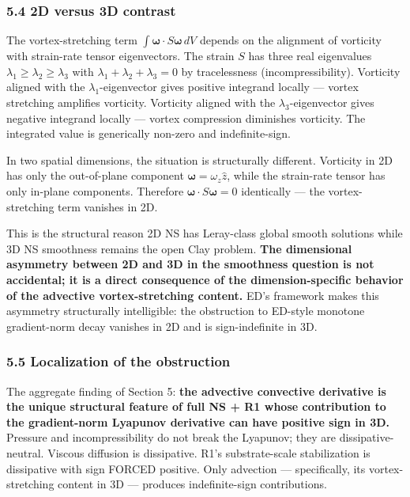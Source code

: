 \documentclass[
  11pt,a4paper]{article}
\begin{document}
\subsubsection{5.4 2D versus 3D contrast}\label{d-versus-3d-contrast}

The vortex-stretching term
\(\int \boldsymbol{\omega} \cdot S\boldsymbol{\omega} \, dV\) depends on
the alignment of vorticity with strain-rate tensor eigenvectors. The
strain \(S\) has three real eigenvalues
\(\lambda_1 \ge \lambda_2 \ge \lambda_3\) with
\(\lambda_1 + \lambda_2 + \lambda_3 = 0\) by tracelessness
(incompressibility). Vorticity aligned with the
\(\lambda_1\)-eigenvector gives positive integrand locally --- vortex
stretching amplifies vorticity. Vorticity aligned with the
\(\lambda_3\)-eigenvector gives negative integrand locally --- vortex
compression diminishes vorticity. The integrated value is generically
non-zero and indefinite-sign.

In two spatial dimensions, the situation is structurally different.
Vorticity in 2D has only the out-of-plane component
\(\boldsymbol{\omega} = \omega_z \hat{z}\), while the strain-rate tensor
has only in-plane components. Therefore
\(\boldsymbol{\omega} \cdot S\boldsymbol{\omega} = 0\) identically ---
the vortex-stretching term vanishes in 2D.

This is the structural reason 2D NS has Leray-class global smooth
solutions while 3D NS smoothness remains the open Clay problem.
\textbf{The dimensional asymmetry between 2D and 3D in the smoothness
question is not accidental; it is a direct consequence of the
dimension-specific behavior of the advective vortex-stretching content.}
ED's framework makes this asymmetry structurally intelligible: the
obstruction to ED-style monotone gradient-norm decay vanishes in 2D and
is sign-indefinite in 3D.

\subsubsection{5.5 Localization of the
obstruction}\label{localization-of-the-obstruction}

The aggregate finding of Section 5: \textbf{the advective convective
derivative is the unique structural feature of full NS + R1 whose
contribution to the gradient-norm Lyapunov derivative can have positive
sign in 3D.} Pressure and incompressibility do not break the Lyapunov;
they are dissipative-neutral. Viscous diffusion is dissipative. R1's
substrate-scale stabilization is dissipative with sign FORCED positive.
Only advection --- specifically, its vortex-stretching content in 3D ---
produces indefinite-sign contributions.
\end{document}
